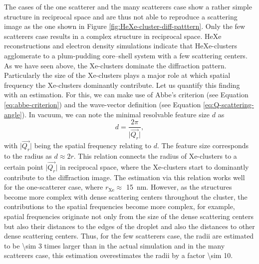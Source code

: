 %
The cases of the one scatterer and the many scatterers case show a rather simple structure in reciprocal space and are thus not able to reproduce a scattering image as the one shown in Figure \ref{fig:HeXe-cluster-diff-patttern}. Only the few scatterers case results in a complex structure in reciprocal space. HeXe reconstructions and electron density simulations indicate that HeXe-clusters agglomerate to a plum-pudding core--shell system with a few scattering centers.\\[1\baselineskip]
%
%
As we have seen above, the Xe-clusters dominate the diffraction pattern. Particularly the size of the Xe-clusters plays a major role at which spatial frequency the Xe-clusters dominantly contribute. Let us quantify this finding with an estimation.
For this, we can make use of Abbe's criterion (see Equation \eqref{eq:abbe-criterion}) and the wave-vector definition (see Equation \eqref{eq:Q-scattering-angle}). In vacuum, we can note the minimal resolvable feature size $d$ as
\begin{equation}
d = \frac{2\pi}{\lvert\vec{Q_{r}}\rvert},
\label{eq:diameter-estimate}
\end{equation}
with $\lvert\vec{Q_{r}}\rvert$ being the spatial frequency relating to $d$. The feature size corresponds to the radius as $d\approx 2 r$. This relation connects the radius of Xe-clusters to a certain point $\lvert\vec{Q_{r}}\rvert$ in reciprocal space, where the Xe-clusters start to dominantly contribute to the diffraction image. The estimation via this relation works well for the one-scatterer case, where $r_{\text{Xe}}\approx$ \SI{15}{\nano\meter}. However, as the structures become more complex with dense scattering centers throughout the cluster, the contributions to the spatial frequencies become more complex, for example, spatial frequencies originate not only from the size of the dense scattering centers but also their distances to the edges of the droplet and also the distances to other dense scattering centers. Thus, for the few scatterers case, the radii are estimated to be \num{\sim 3} times larger than in the actual simulation and in the many scatterers case, this estimation overestimates the radii by a factor \num{\sim 10}.\\[1\baselineskip]
